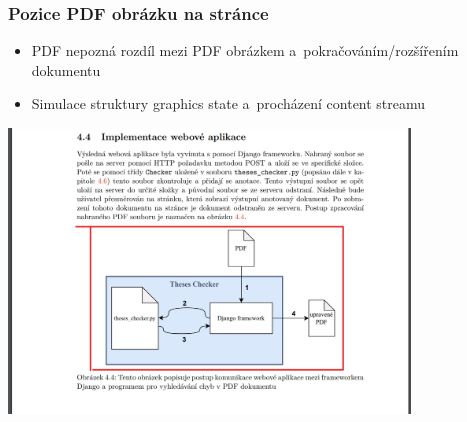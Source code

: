 \begin{frame}\frametitle{Pozice PDF obrázku na stránce}

  \begin{itemize}
    \item PDF nepozná rozdíl mezi PDF obrázkem a~pokračováním/rozšířením dokumentu 
    \item Simulace struktury graphics state a~procházení content streamu
  \end{itemize}
  \centering
  \includegraphics[width=0.8\textwidth]{img/PDF-picture.png}
\end{frame}



